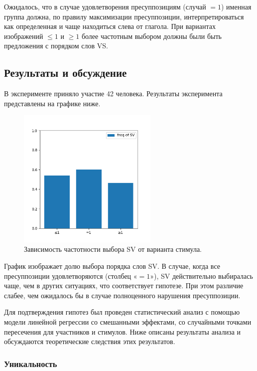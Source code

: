 \documentclass[a4paper, 12pt]{article}
\begin{document}
Ожидалось, что в случае удовлетворения пресуппозициям (случай $=1$) именная группа должна, по правилу максимизации пресуппозиции, интерпретироваться как определенная и чаще находиться слева от глагола. При вариантах изображений $\le 1$ и $\ge 1$ более частотным выбором должны были быть предложения с порядком слов VS.

\subsection{Результаты и обсуждение}

В эксперименте приняло участие 42 человека. Результаты эксперимента представлены на графике ниже.

\begin{figure}
    \centering
    \includegraphics[width=0.6\textwidth]{images/plot.png}
    \caption{Зависимость частотности выбора SV от варианта стимула.}
    \label{plot}
\end{figure}

График изображает долю выбора порядка слов SV. В случае, когда все пресуппозиции удовлетворяются (столбец «$=1$»), SV действительно выбиралась чаще, чем в других ситуациях, что соответствует гипотезе. При этом различие слабее, чем ожидалось бы в случае полноценного нарушения пресуппозиции.

Для подтверждения гипотез был проведен статистический анализ с помощью модели линейной регрессии со смешанными эффектами, со случайными точками пересечения для участников и стимулов. Ниже описаны результаты анализа и обсуждаются теоретические следствия этих результатов.

\subsubsection{Уникальность}
\end{document}
